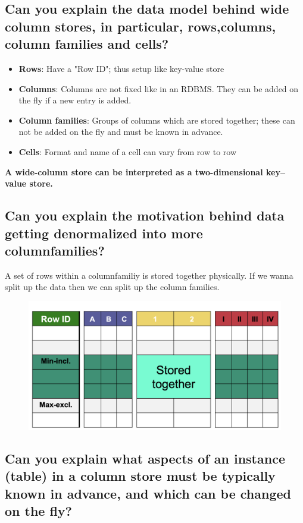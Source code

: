 \documentclass{article}
\begin{document}
\subsection{Can you explain the data model behind wide column stores, in particular, rows,columns, column families and cells?}

\begin{itemize}
\item \textbf{Rows}: Have a "Row ID"; thus setup like key-value store 
\item \textbf{Columns}: Columns are not fixed like in an RDBMS. They can be added on the fly if a new entry is added. 
\item \textbf{Column families}: Groups of columns which are stored together; these can not be added on the fly and must be known in advance. 
\item \textbf{Cells}: Format and name of a cell can vary from row to row
\end{itemize}

\textbf{A wide-column store can be interpreted as a two-dimensional key–value store.}

\subsection{Can you explain the motivation behind data getting denormalized into more columnfamilies?}

A set of rows within a columnfamiliy is stored together physically. If we wanna split up the data then we can split up the column families. 

\begin{figure}[H]
    \centering
    \includegraphics[width=0.5\linewidth]{img/storetog.png}
\end{figure}

\subsection{Can you explain what aspects of an instance (table) in a column store must be typically known in advance, and which can be changed on the fly?}
\end{document}
